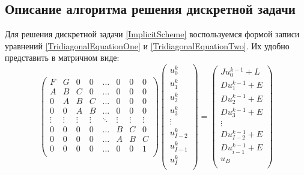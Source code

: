 \documentclass[a4paper,12pt,russian, fleqn]{extreport}
\begin{document}
	\subsection{Описание алгоритма решения дискретной задачи}
	Для решения дискретной задачи \eqref{ImplicitScheme} воспользуемся формой записи уравнений \eqref{TridiagonalEquationOne} и \eqref{TridiagonalEquationTwo}. Их удобно представить в матричном виде:
	\begin{equation}\label{System}
		\left(
		\begin{array}{cccccccc}
		F & G & 0 & 0 & \dots & 0 & 0 & 0 \\
		A & B & C & 0 & \dots & 0 & 0 & 0 \\
		0 & A & B & C & \dots & 0 & 0 & 0 \\
		0 & 0 & A & B & \dots & 0 & 0 & 0 \\
		\vdots & \vdots & \vdots & \vdots & \ddots & \vdots & \vdots & \vdots \\
		0 & 0 & 0 & 0 & \dots & B & C & 0 \\		
		0 & 0 & 0 & 0 & \dots & A & B & C \\			
		0 & 0 & 0 & 0 & \dots & 0 & 0 & 1 \\		
		\end{array}
		\right) \left(
		\begin{array}{c}
			u_0^k \\
			u_1^k \\
			u_2^k \\
			u_3^k \\
			\vdots \\
			u_{I-2}^k\\												
			u_{I-1}^k\\
			u_I^k \\		
		\end{array}
		\right) = \left ( 	
		\begin{array}{c}
		Ju_0^{k-1} + L \\
		Du_1^{k-1} + E \\
		Du_2^{k-1} + E \\
		Du_3^{k-1} + E \\
		\vdots \\
		Du_{I-2}^{k-1} + E\\												
		Du_{i-1}^{k-1} + E\\
		u_B \\		
		\end{array} \right)
	\end{equation}
	
\end{document}
